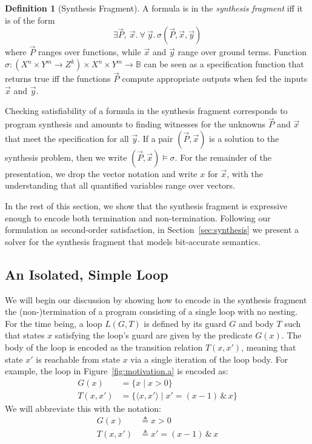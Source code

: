 \documentclass[preprint]{sigplanconf}
\theoremstyle{definition}
\newtheorem{definition}[theorem]{Definition}
\begin{document}
\begin{definition}[Synthesis Fragment]
A formula is in the \emph{synthesis fragment} iff it is of the form
%
 \[
  \exists \vec{P},~ \vec{x} . ~\forall~ \vec{y} .\, \sigma(\vec{P}, \vec{x}, \vec{y})
 \]
%
where $\vec{P}$ ranges over functions, while $\vec{x}$ and $\vec{y}$ range over
ground terms.  Function $\sigma: (X^n \times Y^m \to Z^k) \times X^n \times
Y^m \to \mathbb{B}$ can be seen as a specification function that returns
true iff the functions $\vec{P}$ compute appropriate outputs when fed the
inputs $\vec{x}$ and $\vec{y}$.
%
\end{definition}
%
Checking satisfiability of a formula in the synthesis fragment corresponds to program synthesis and
amounts to finding witnesses for the unknowns $\vec{P}$ and $\vec{x}$ that meet the specification
for all $\vec{y}$. 
If a pair $(\vec{P}, \vec{x})$ is a solution to the synthesis problem, then we write $(\vec{P}, \vec{x}) \models \sigma$.
For the remainder of the presentation, we drop the vector notation and write $x$ for $\vec{x}$, with the understanding
that all quantified variables range over vectors.

In the rest of this section, we show that the synthesis fragment 
is expressive enough to encode both termination and non-termination. 
Following our formulation as second-order satisfaction, 
in Section~\ref{sec:synthesis} we present a solver for the synthesis fragment that models bit-accurate semantics. 



\subsection{An Isolated, Simple Loop}

We will begin our discussion by showing how to encode in the synthesis fragment the
\mbox{(non-)termination} of a program consisting of a single loop with no nesting.
For the time being, a loop $L(G, T)$ is defined by its guard $G$ and body $T$
such that states $x$ satisfying the loop's guard are given by the
predicate $G(x)$.  The body of the loop is encoded as the transition
relation $T(x, x')$, meaning that state $x'$ is reachable from state $x$ via
a single iteration of the loop body.  For example, the loop in
Figure~\ref{fig:motivation.a} is encoded as:
%
\begin{align*}
G(x) & = \{ x \mid x>0 \} \\
T(x,x') &= \{ \langle x, x' \rangle \mid x' = (x - 1) \, \& \, x \}
\end{align*}
We will abbreviate this with the notation:
\begin{align*}
G(x) & \triangleq x > 0 \\
T(x, x') & \triangleq x' = (x - 1) \, \& \, x
\end{align*}
\end{document}
